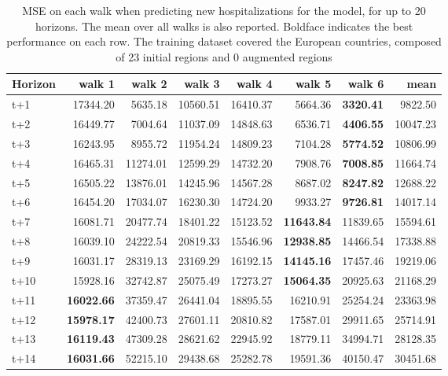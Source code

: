\begin{table}[H]
\centering
\caption{MSE on each walk when predicting new hospitalizations for the model, for up to 20 horizons. The mean over all walks is also reported. Boldface indicates the best performance on each row. The training dataset covered the European countries, composed of 23 initial regions and 0 augmented regions }
\label{tab:MSE_walk_encoder_decoder}
\begin{tabular}{lrrrrrrr}
\toprule
Horizon &   walk 1 &   walk 2 &   walk 3 &   walk 4 &   walk 5 &   walk 6 &     mean \\
\midrule
t+1  & 17344.20  & 5635.18  & 10560.51  & 16410.37  & 5664.36  & \textbf{3320.41}  & 9822.50  \\
t+2  & 16449.77  & 7004.64  & 11037.09  & 14848.63  & 6536.71  & \textbf{4406.55}  & 10047.23  \\
t+3  & 16243.95  & 8955.72  & 11954.24  & 14809.23  & 7104.28  & \textbf{5774.52}  & 10806.99  \\
t+4  & 16465.31  & 11274.01  & 12599.29  & 14732.20  & 7908.76  & \textbf{7008.85}  & 11664.74  \\
t+5  & 16505.22  & 13876.01  & 14245.96  & 14567.28  & 8687.02  & \textbf{8247.82}  & 12688.22  \\
t+6  & 16454.20  & 17034.07  & 16230.30  & 14724.20  & 9933.27  & \textbf{9726.81}  & 14017.14  \\
t+7  & 16081.71  & 20477.74  & 18401.22  & 15123.52  & \textbf{11643.84}  & 11839.65  & 15594.61  \\
t+8  & 16039.10  & 24222.54  & 20819.33  & 15546.96  & \textbf{12938.85}  & 14466.54  & 17338.88  \\
t+9  & 16031.17  & 28319.13  & 23169.29  & 16192.15  & \textbf{14145.16}  & 17457.46  & 19219.06  \\
t+10  & 15928.16  & 32742.87  & 25075.49  & 17273.27  & \textbf{15064.35}  & 20925.63  & 21168.29  \\
t+11  & \textbf{16022.66}  & 37359.47  & 26441.04  & 18895.55  & 16210.91  & 25254.24  & 23363.98  \\
t+12  & \textbf{15978.17}  & 42400.73  & 27601.11  & 20810.82  & 17587.01  & 29911.65  & 25714.91  \\
t+13  & \textbf{16119.43}  & 47309.28  & 28621.62  & 22945.92  & 18779.11  & 34994.71  & 28128.35  \\
t+14  & \textbf{16031.66}  & 52215.10  & 29438.68  & 25282.78  & 19591.36  & 40150.47  & 30451.68  \\

\end{tabular}
\end{table}
